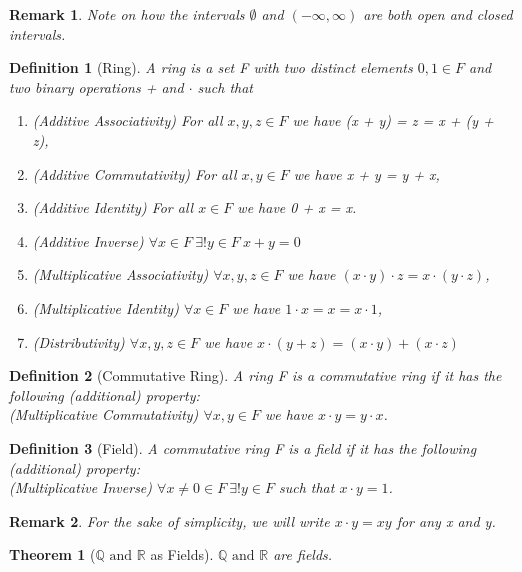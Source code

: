 \documentclass[11pt, oneside]{book}
\theoremstyle{break}
\newtheorem{thm}{Theorem}[section]
\newtheorem*{remark}{Remark}
\newtheorem{defn}{Definition}[section]
\newcommand{\bb}[1]{\mathbb{#1}}			%
\begin{document}
\begin{remark}
	Note on how the intervals $\emptyset$ and $(-\infty, \infty)$ are both open and closed intervals.
\end{remark}

\begin{defn}[Ring]
	A ring is a set F with two distinct elements $0, 1 \in F$ and two binary operations + and $\cdot$ such that
	\begin{enumerate}
		\item (Additive Associativity) For all $x, y, z \in F$ we have (x + y) = z = x + (y + z),
		\item (Additive Commutativity) For all $x, y \in F$ we have x + y = y + x,
		\item (Additive Identity) For all $x \in F$ we have 0 + x = x.
		\item (Additive Inverse) $\forall x \in F \> \exists! y \in F \> x + y = 0$
		\item (Multiplicative Associativity) $\forall x, y, z \in F$ we have $(x \cdot y) \cdot z = x \cdot (y \cdot z)$,
		\item (Multiplicative Identity) $\forall x \in F$ we have $1 \cdot x = x = x \cdot 1$,
		\item (Distributivity) $\forall x, y, z \in F$ we have $x \cdot (y + z) = (x \cdot y) + (x \cdot z)$
	\end{enumerate}
\end{defn}

\begin{defn}[Commutative Ring]
	A ring F is a commutative ring if it has the following (additional) property: \\
	(Multiplicative Commutativity) $\forall x, y \in F$ we have $x \cdot y = y \cdot x$.
\end{defn}

\begin{defn}[Field]
	A commutative ring F is a field if it has the following (additional) property: \\
	(Multiplicative Inverse) $\forall x \neq 0 \in F \> \exists! y \in F$ such that $x \cdot y = 1$.
\end{defn}

\begin{remark}
	For the sake of simplicity, we will write $x \cdot y = xy$ for any x and y.
\end{remark}

\begin{thm}[$\bb{Q} \text{ and } \bb{R}$ as Fields]
	$\bb{Q} \text{ and } \bb{R}$ are fields.
\end{thm}
\end{document}
